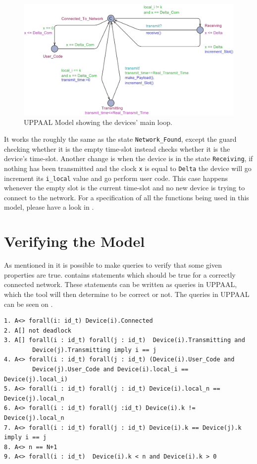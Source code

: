 \begin{figure}
  \includegraphics[width=1\textwidth]{Figures/Model/Device_Connected.pdf} 
\caption{UPPAAL Model showing the devices' main loop.}
\label{fig:UPPAAL_Connected}
\end{figure}

It works the roughly the same as the state \texttt{Network\_Found}, except the guard checking whether it is the empty time-slot instead checks whether it is the device's time-slot.
Another change is when the device is in the state \texttt{Receiving}, if nothing has been transmitted and the clock \texttt{x} is equal to \texttt{Delta} the device will go increment its \texttt{i\_local} value and go perform user code. 
This case happens whenever the empty slot is the current time-slot and no new device is trying to connect to the network.
For a specification of all the functions being used in this model, please have a look in .

\section{Verifying the Model}

As mentioned in  it is possible to make queries to verify that some given properties are true.
 contains statements which should be true for a correctly connected network.
These statements can be written as queries in UPPAAL, which the tool will then determine to be correct or not. 
The queries in UPPAAL can be seen on .

\begin{lstlisting}[language={[GUI]Uppaal}, % use GUI flavor
columns={[l]flexible},
frameround=fftt, frame=shadowbox, rulesepcolor=\color{gray},label=lst:UPPAAL_Queries,
caption={Queries for the UPPAAL Model}]
1. A<> forall(i: id_t) Device(i).Connected
2. A[] not deadlock
3. A[] forall(i : id_t) forall(j : id_t)  Device(i).Transmitting and 
		Device(j).Transmitting imply i == j
4. A<> forall(i : id_t) forall(j : id_t) (Device(i).User_Code and 
		Device(j).User_Code and Device(i).local_i == Device(j).local_i)
5. A<> forall(i : id_t) forall(j : id_t) Device(i).local_n == Device(j).local_n
6. A<> forall(i : id_t) forall(j :id_t) Device(i).k != Device(j).local_n
7. A<> forall(i : id_t) forall(j : id_t) Device(i).k == Device(j).k imply i == j
8. A<> n == N+1
9. A<> forall(i : id_t)  Device(i).k < n and Device(i).k > 0
\end{lstlisting}

